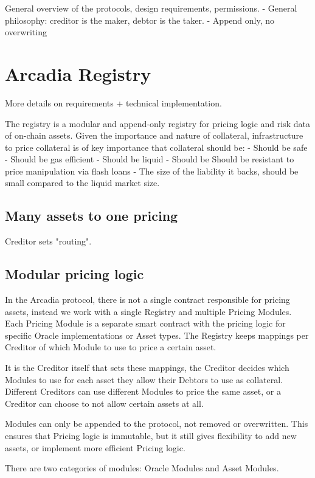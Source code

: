 \documentclass[sigconf,nonacm]{acmart}
\begin{document}
General overview of the protocols, design requirements, permissions.
- General philosophy: creditor is the maker, debtor is the taker.
- Append only, no overwriting 

\lipsum[2]

\section{Arcadia Registry}
\label{sec:arcadia-registry}

More details on requirements + technical implementation.

The registry is a modular and append-only registry for pricing logic and risk data of on-chain assets.
Given the importance and nature of collateral, infrastructure to price collateral is of key importance that collateral should be:
- Should be safe
- Should be gas efficient
- Should be liquid
- Should be Should be resistant to price manipulation via flash loans
- The size of the liability it backs, should be small compared to the liquid market size.

\subsection{Many assets to one pricing}
Creditor sets "routing".

\subsection{Modular pricing logic}
In the Arcadia protocol, there is not a single contract responsible for pricing assets, instead we work with a single Registry and multiple Pricing Modules.
Each Pricing Module is a separate smart contract with the pricing logic for specific Oracle implementations or Asset types.
The Registry keeps mappings per Creditor of which Module to use to price a certain asset.

It is the Creditor itself that sets these mappings, the Creditor decides which Modules to use for each asset they allow their Debtors to use as collateral.
Different Creditors can use different Modules to price the same asset, or a Creditor can choose to not allow certain assets at all.

Modules can only be appended to the protocol, not removed or overwritten.
This ensures that Pricing logic is immutable, but it still gives flexibility to add new assets, or implement more efficient Pricing logic.

There are two categories of modules: Oracle Modules and Asset Modules.
\end{document}
